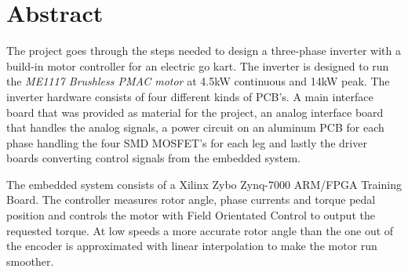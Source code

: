 \section{Abstract}
The project goes through the steps needed to design a three-phase inverter with a build-in motor controller for an electric go kart.
The inverter is designed to run the \textit{ME1117 Brushless PMAC motor} at 4.5kW continuous and 14kW peak. The inverter hardware consists of four different kinds of PCB's. A main interface board that was provided as material for the project, an analog interface board that handles the analog signals, a power circuit on an aluminum PCB for each phase handling the four SMD MOSFET's for each leg and lastly the driver boards 
converting control signals from the embedded system.

The embedded system consists of a Xilinx Zybo Zynq-7000 ARM/FPGA Training Board. The controller measures rotor angle, phase currents and torque pedal position and controls the motor with Field Orientated Control to output the requested torque. 
At low speeds a more accurate rotor angle than the one out of the encoder is approximated with linear interpolation to make the motor run smoother.

